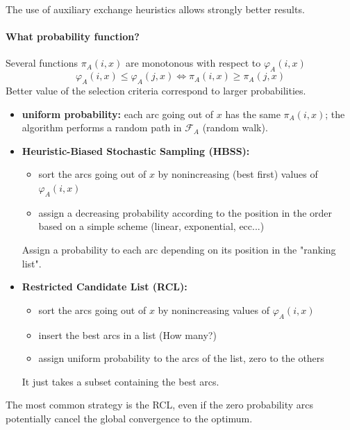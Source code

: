 \documentclass[11pt]{article}
\begin{document}
	The use of auxiliary exchange heuristics allows strongly better results.\\
	
	\paragraph{What probability function?} Several functions $\pi_A (i, x)$ are monotonous with respect to $\varphi_A (i, x)$
	$$ \varphi_A (i,x) \leq \varphi_A (j,x) \Leftrightarrow \pi_A (i,x) \geq \pi_A (j,x) $$
	Better value of the selection criteria correspond to larger probabilities.
	
	\begin{itemize}
		\item \textbf{uniform probability:} each arc going out of $x$ has the same $\pi_A (i, x)$; the algorithm performs a random path in $\mathcal{F}_A$ (random walk).\\
		
		\item \textbf{Heuristic-Biased Stochastic Sampling (HBSS):}
		\begin{itemize}
			\item sort the arcs going out of $x$ by nonincreasing (best first) values of $\varphi_A (i, x)$
			\item assign a decreasing probability according to the position in the order based on a simple scheme (linear, exponential, ecc...)
		\end{itemize}
		Assign a probability to each arc depending on its position in the "ranking list".\\
		
		\item \textbf{Restricted Candidate List (RCL):}
		\begin{itemize}
			\item sort the arcs going out of $x$ by nonincreasing values of $\varphi_A (i, x)$
			\item insert the best arcs in a list (How many?)
			\item assign uniform probability to the arcs of the list, zero to the others
		\end{itemize}
		It just takes a subset containing the best arcs.\\
	\end{itemize}
	
	The most common strategy is the RCL, even if the zero probability arcs potentially cancel the global convergence to the optimum.
	
	\newpage
	
\end{document}
